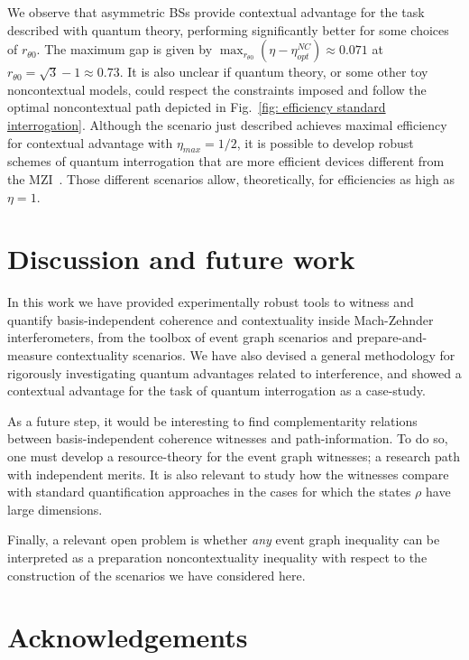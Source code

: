 \documentclass[a4paper,twocolumn,11pt,accepted=2024-01-17]{quantumarticle}
\begin{document}
We observe that asymmetric BSs provide contextual advantage for the task described with quantum theory, performing significantly better for some choices of $r_{\theta 0}$. The maximum gap is given by $\max_{r_{\theta 0}}(\eta - \eta_{opt}^{NC}) \approx 0.071$ at $r_{\theta 0} =\sqrt{3}-1 \approx 0.73$. It is also unclear if quantum theory, or some other toy noncontextual models, could respect the constraints imposed and follow the optimal noncontextual path depicted in Fig.~\ref{fig: efficiency standard interrogation}. Although the scenario just described achieves maximal efficiency for contextual advantage with $\eta_{max} = 1/2$, it is possible to develop robust schemes of quantum interrogation that are more efficient devices different from the MZI~\cite{kwiat1995interactionfree,kwiat1999high,rudolph2000better}. Those different scenarios allow, theoretically, for efficiencies as high as $\eta = 1$.






\section{Discussion and future work}

In this work we have provided experimentally robust tools to witness and quantify basis-independent coherence and contextuality inside Mach-Zehnder interferometers, from the toolbox of event graph scenarios and prepare-and-measure contextuality scenarios. We have also devised a general methodology for rigorously investigating quantum advantages related to interference, and showed a contextual advantage for the task of quantum interrogation as a case-study.

As a future step, it would be interesting to find complementarity relations between basis-independent coherence witnesses and path-information. To do so, one must develop a resource-theory for the event graph witnesses; a research path with independent merits. It is also relevant to study how the witnesses compare with standard quantification approaches in the cases for which the states $\rho$ have large dimensions. 

Finally, a relevant open problem is whether \textit{any} event graph inequality can be interpreted as a preparation noncontextuality inequality with respect to the construction of the scenarios we have considered here. 

\section{Acknowledgements}
\end{document}
